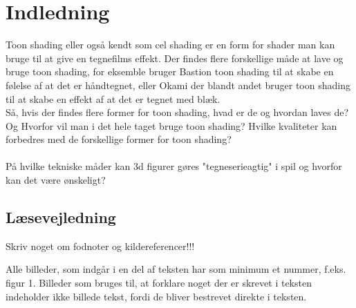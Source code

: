 \section*{Indledning}
\thispagestyle{empty}
Toon shading eller også kendt som cel shading er en form for shader man kan bruge til at give en tegnefilms effekt. Der findes flere forskellige måde at lave og bruge toon shading, for eksemble bruger Bastion toon shading til at skabe en følelse af at det er håndtegnet, eller Okami der blandt andet bruger toon shading til at skabe en effekt af at det er tegnet med blæk.
\\
Så, hvis der findes flere former for toon shading, hvad er de og hvordan laves de? Og Hvorfor vil man i det hele taget bruge toon shading? Hvilke kvaliteter kan forbedres med de forskellige former for toon shading?
\\
\\
På hvilke tekniske måder kan 3d figurer gøres "tegneserieagtig"
i spil og hvorfor kan det være ønskeligt?

\subsection*{Læsevejledning}
Skriv noget om fodnoter og kildereferencer!!!

Alle billeder, som indgår i en del af teksten har som minimum et nummer, f.eks. figur 1. Billeder som bruges til, at forklare noget der er skrevet i teksten indeholder ikke billede tekst, fordi de bliver bestrevet direkte i teksten. 